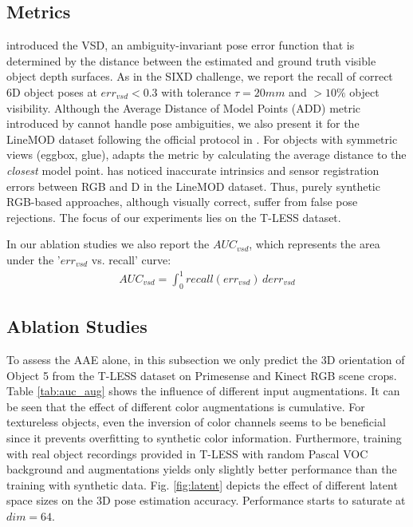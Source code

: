 {{\begin{table}
	\end{table}



\subsection{Metrics}

\cite{hodan2016evaluation}  introduced the \gls{VSD}, an ambiguity-invariant pose error function that is determined by the distance between the estimated and ground truth visible object depth surfaces. As in the SIXD challenge, we report the recall of correct 6D object poses at $err_{vsd} < 0.3$ with tolerance $\tau = 20mm$ and $>10\%$ object visibility. Although the Average Distance of Model Points (ADD) metric introduced by \cite{hinterstoisser2012model} cannot handle pose ambiguities, we also present it for the LineMOD dataset following the official protocol in \cite{hinterstoisser2012model}. For objects with symmetric views (eggbox, glue), \cite{hinterstoisser2012model} adapts the metric by calculating the average distance to the \textit{closest} model point. \cite{Manhardt_2018_ECCV} has noticed inaccurate intrinsics and sensor registration errors between RGB and D in the LineMOD dataset. Thus, purely synthetic RGB-based approaches, although visually correct, suffer from false pose rejections. The focus of our experiments lies on the T-LESS dataset.

 In our ablation studies we also report the $AUC_{vsd}$, which represents the area under the '$err_{vsd}$ vs. recall' curve: 
\begin{align}
AUC_{vsd} = \int_0^1recall(err_{vsd})\,derr_{vsd}
\end{align}

	\subsection{Ablation Studies}
	To assess the \gls{AAE} alone, in this subsection we only predict the 3D orientation of Object 5 from the T-LESS dataset on Primesense and Kinect RGB scene crops. 
	Table \ref{tab:auc_aug} shows the influence of different input augmentations. 
	It can be seen that the effect of different color augmentations is cumulative. For textureless objects, even the inversion of color channels seems to be beneficial since it prevents overfitting to synthetic color information. Furthermore, training with real object recordings provided in T-LESS with random Pascal VOC background and augmentations yields only slightly better performance than the training with synthetic data.
	Fig. \ref{fig:latent} depicts the effect of different latent space sizes on the 3D pose estimation accuracy. Performance starts to saturate at $dim = 64$. 
	

}}
